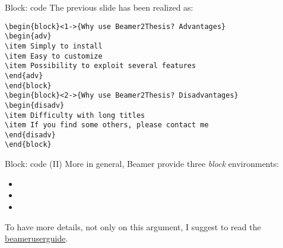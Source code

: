 \begin{frame}[t,fragile]{Block: code}
The previous slide has been realized as:
\small{\begin{verbatim}
\begin{block}<1->{Why use Beamer2Thesis? Advantages}
\begin{adv}
\item Simply to install
\item Easy to customize
\item Possibility to exploit several features
\end{adv}
\end{block}
\begin{block}<2->{Why use Beamer2Thesis? Disadvantages}
\begin{disadv}
\item Difficulty with long titles
\item If you find some others, please contact me 
\end{disadv}
\end{block}
\end{verbatim}}
\end{frame}

\begin{frame}[t,fragile]{Block: code (II)}
More in general, Beamer provide three \emph{block} environments:
\begin{itemize}
\item {}
\item {}
\item {}
\end{itemize}
To have more details, not only on this argument, I suggest to read the \href{http://mirrors.ctan.org/macros/latex/contrib/beamer/doc/beameruserguide.pdf}{beameruserguide}.
\end{frame}
